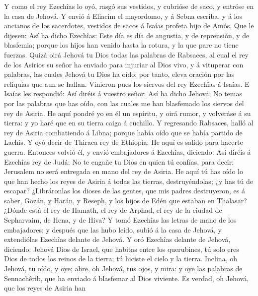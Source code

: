  Y como el rey Ezechîas lo oyó, rasgó sus vestidos, y
cubrióse de saco, y entróse en la casa de Jehová.  Y envió
á Eliacim el mayordomo, y á Sebna escriba, y á los ancianos de los
sacerdotes, vestidos de sacos á Isaías profeta hijo de Amós,
 Que le dijesen: Así ha dicho Ezechîas: Este día es día de
angustia, y de reprensión, y de blasfemia; porque los hijos han venido
hasta la rotura, y la que pare no tiene fuerzas.  Quizá
oirá Jehová tu Dios todas las palabras de Rabsaces, al cual el rey de
los Asirios su señor ha enviado para injuriar al Dios vivo, y á
vituperar con palabras, las cuales Jehová tu Dios ha oído: por tanto,
eleva oración por las reliquias que aun se hallan. 
Vinieron pues los siervos del rey Ezechîas á Isaías.  E
Isaías les respondió: Así diréis á vuestro señor: Así ha dicho Jehová;
No temas por las palabras que has oído, con las cuales me han blasfemado
los siervos del rey de Asiria.  He aquí pondré yo en él un
espíritu, y oirá rumor, y volveráse á su tierra: y yo haré que en su
tierra caiga á cuchillo.  Y regresando Rabsaces, halló al
rey de Asiria combatiendo á Libna; porque había oído que se había
partido de Lachîs.  Y oyó decir de Thiraca rey de
Ethiopía: He aquí es salido para hacerte guerra. Entonces volvió él, y
envió embajadores á Ezechîas, diciendo:  Así diréis á
Ezechîas rey de Judá: No te engañe tu Dios en quien tú confías, para
decir: Jerusalem no será entregada en mano del rey de Asiria.
 He aquí tú has oído lo que han hecho los reyes de Asiria
á todas las tierras, destruyéndolas; ¿y has tú de escapar?
 ¿Libráronlas los dioses de las gentes, que mis padres
destruyeron, es á saber, Gozán, y Harán, y Reseph, y los hijos de Edén
que estaban en Thalasar?  ¿Dónde está el rey de Hamath,
el rey de Arphad, el rey de la ciudad de Sepharvaim, de Hena, y de Hiva?
 Y tomó Ezechîas las letras de mano de los embajadores; y
después que las hubo leído, subió á la casa de Jehová, y extendiólas
Ezechîas delante de Jehová.  Y oró Ezechîas delante de
Jehová, diciendo: Jehová Dios de Israel, que habitas entre los
querubines, tú solo eres Dios de todos los reinos de la tierra; tú
hiciste el cielo y la tierra.  Inclina, oh Jehová, tu
oído, y oye; abre, oh Jehová, tus ojos, y mira: y oye las palabras de
Sennachêrib, que ha enviado á blasfemar al Dios viviente.
 Es verdad, oh Jehová, que los reyes de Asiria han
